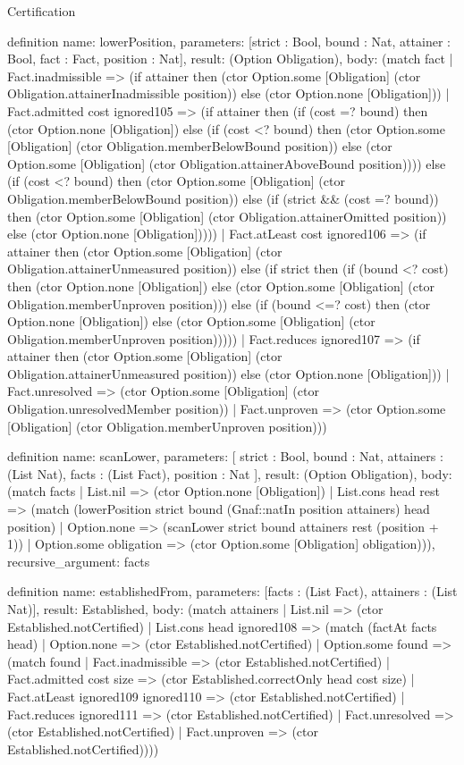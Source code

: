 \begin{lexlean}{Certification}
\begin{semanticmodule}
definition{
  name: lowerPosition,
  parameters: [strict : Bool, bound : Nat, attainer : Bool, fact : Fact, position : Nat],
  result: (Option Obligation),
  body: (match fact
    | Fact.inadmissible => (if attainer then (ctor Option.some [Obligation] (ctor Obligation.attainerInadmissible position)) else (ctor Option.none [Obligation]))
    | Fact.admitted cost ignored105 => (if attainer then (if (cost =? bound) then (ctor Option.none [Obligation]) else (if (cost <? bound) then (ctor Option.some [Obligation] (ctor Obligation.memberBelowBound position)) else (ctor Option.some [Obligation] (ctor Obligation.attainerAboveBound position)))) else (if (cost <? bound) then (ctor Option.some [Obligation] (ctor Obligation.memberBelowBound position)) else (if (strict && (cost =? bound)) then (ctor Option.some [Obligation] (ctor Obligation.attainerOmitted position)) else (ctor Option.none [Obligation]))))
    | Fact.atLeast cost ignored106 => (if attainer then (ctor Option.some [Obligation] (ctor Obligation.attainerUnmeasured position)) else (if strict then (if (bound <? cost) then (ctor Option.none [Obligation]) else (ctor Option.some [Obligation] (ctor Obligation.memberUnproven position))) else (if (bound <=? cost) then (ctor Option.none [Obligation]) else (ctor Option.some [Obligation] (ctor Obligation.memberUnproven position)))))
    | Fact.reduces ignored107 => (if attainer then (ctor Option.some [Obligation] (ctor Obligation.attainerUnmeasured position)) else (ctor Option.none [Obligation]))
    | Fact.unresolved => (ctor Option.some [Obligation] (ctor Obligation.unresolvedMember position))
    | Fact.unproven => (ctor Option.some [Obligation] (ctor Obligation.memberUnproven position)))
}

definition{
  name: scanLower,
  parameters: [
    strict : Bool,
    bound : Nat,
    attainers : (List Nat),
    facts : (List Fact),
    position : Nat
  ],
  result: (Option Obligation),
  body: (match facts
    | List.nil => (ctor Option.none [Obligation])
    | List.cons head rest => (match (lowerPosition strict bound (Gnaf::natIn position attainers) head position)
      | Option.none => (scanLower strict bound attainers rest (position + 1))
      | Option.some obligation => (ctor Option.some [Obligation] obligation))),
  recursive_argument: facts
}

definition{
  name: establishedFrom,
  parameters: [facts : (List Fact), attainers : (List Nat)],
  result: Established,
  body: (match attainers
    | List.nil => (ctor Established.notCertified)
    | List.cons head ignored108 => (match (factAt facts head)
      | Option.none => (ctor Established.notCertified)
      | Option.some found => (match found
        | Fact.inadmissible => (ctor Established.notCertified)
        | Fact.admitted cost size => (ctor Established.correctOnly head cost size)
        | Fact.atLeast ignored109 ignored110 => (ctor Established.notCertified)
        | Fact.reduces ignored111 => (ctor Established.notCertified)
        | Fact.unresolved => (ctor Established.notCertified)
        | Fact.unproven => (ctor Established.notCertified))))
}


\end{semanticmodule}
\end{lexlean}
